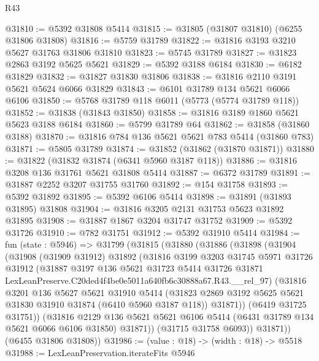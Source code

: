 \begin{lexlean}{R43}
\begin{coremodule}
@31810 := @5392 @31808 @5414
@31815 := @31805 (@31807 @31810) (@6255 @31806 @31808)
@31816 := @5759 @31789
@31822 := @31816 @3193 @3210 @5627 @31763 @31806 @31810
@31823 := @5745 @31789
@31827 := @31823 @2863 @3192 @5625 @5621
@31829 := @5392 @3188 @6184
@31830 := @6182 @31829
@31832 := @31827 @31830 @31806
@31838 := @31816 @2110 @3191 @5621 @5624 @6066 @31829
@31843 := @6101 @31789 @134 @5621 @6066 @6106
@31850 := @5768 @31789 @118 @6011 (@5773 (@5774 @31789 @118))
@31852 := @31838 (@31843 @31850)
@31858 := @31816 @3189 @1860 @5621 @5623 @3188 @6184
@31860 := @5799 @31789 @64
@31862 := @31858 (@31860 @3188)
@31870 := @31816 @784 @136 @5621 @5621 @783 @5414 (@31860 @783)
@31871 := @5805 @31789
@31874 := @31852 (@31862 (@31870 @31871))
@31880 := @31822 (@31832 @31874 (@6341 @5960 @3187 @118))
@31886 := @31816 @3208 @136 @31761 @5621 @31808 @5414
@31887 := @6372 @31789
@31891 := @31887 @2252 @3207 @31755 @31760
@31892 := @154 @31758
@31893 := @5392 @31892
@31895 := @5392 @6106 @5414
@31898 := @31891 (@31893 @31895) @31808
@31904 := @31816 @3205 @2131 @31753 @5623 @31892 @31895
@31908 := @31887 @1867 @3204 @31747 @31752
@31909 := @5392 @31726
@31910 := @782 @31751
@31912 := @5392 @31910 @5414
@31984 := fun (state : @5946) =>
  @31799
    (@31815
      (@31880
        (@31886
          (@31898
            (@31904
              (@31908
                (@31909 @31912)
                @31892
                (@31816
                  @3199
                  @3203
                  @31745
                  @5971
                  @31726
                  @31912
                  (@31887
                    @3197
                    @136
                    @5621
                    @31723
                    @5414
                    @31726
                    @31871
                    LexLeanPreserve.C20ded4f4be0e5011a640fb6c30888a67.R43.__rel_97)
                  (@31816
                    @3201
                    @136
                    @5627
                    @5621
                    @31910
                    @5414
                    (@31823 @2869 @3192 @5625 @5621 @31830 @31910 @31874 (@6410 @5960 @3187 @118))
                    @31871))
                (@6419 @31725 @31751))
              (@31816
                @2129
                @136
                @5621
                @5621
                @6106
                @5414
                (@6431 @31789 @134 @5621 @6066 @6106 @31850)
                @31871))
            (@31715 @31758 @6093))
          @31871))
      (@6455 @31806 @31808))
@31986 := (value : @18) -> (width : @18) -> @5518
@31988 := LexLeanPreservation.iterateFits @5946

\end{coremodule}
\end{lexlean}
